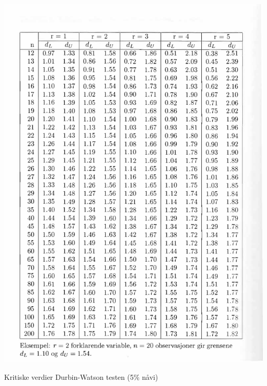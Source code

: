 \begin{table}[H]
\centering
  \includegraphics[scale=1.0]{figurer/Tabell_9_Durbin_Watson_test.pdf}
 \caption{Kritiske verdier Durbin-Watson testen (5\% nåvi)}
 \label{tab:Durbin_Watson_test} %
\end{table}

